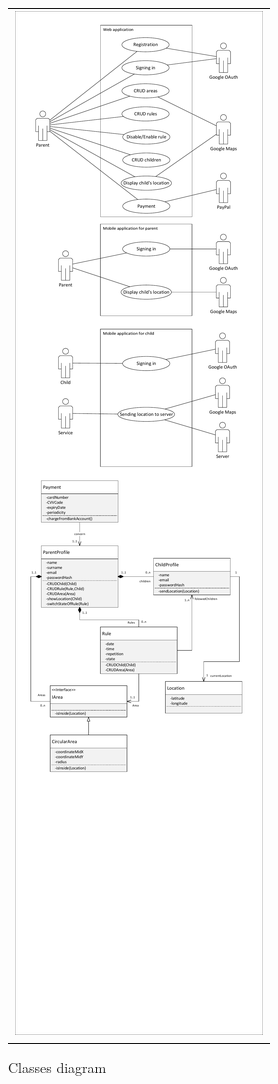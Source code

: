 \documentclass{sprawozdanie-agh}
\begin{document}
		\begin{figure}[H]
			\centering
			\begin{tabular}{c}
				\includegraphics[width=.95\textwidth]{classes} 
			\end{tabular}
		\caption{Classes diagram}
		\end{figure}
	
\end{document}
